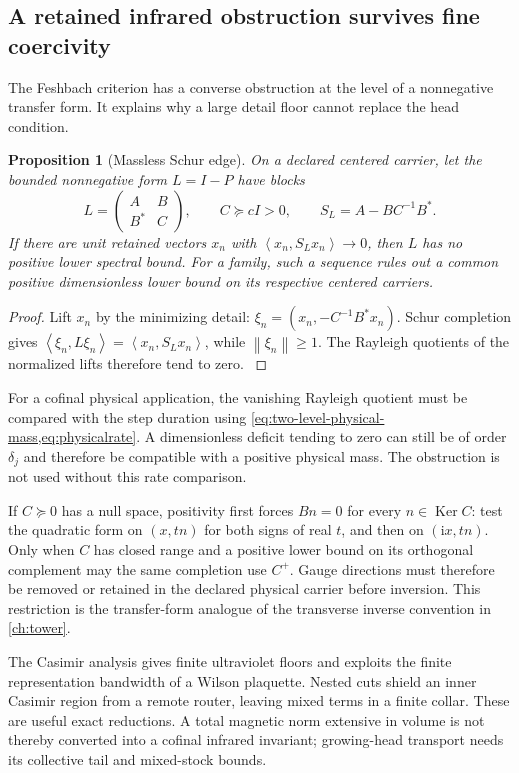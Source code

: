 \documentclass[11pt,oneside,openany]{book}
\newtheorem{proposition}[proposition]{Proposition}
\theoremstyle{definition}
\theoremstyle{remark}
\newcommand{\ii}{\mathrm i}
\newcommand{\Ker}{\operatorname{Ker}}
\newcommand{\norm}[1]{\left\lVert#1\right\rVert}
\newcommand{\ip}[2]{\left\langle#1,#2\right\rangle}
\newcommand{\src}[2]{\cite[#2]{#1}}
\begin{document}
\subsection{A retained infrared obstruction survives fine coercivity}
The Feshbach criterion has a converse obstruction at the level of a
nonnegative transfer form. It explains why a large detail floor cannot
replace the head condition.

\begin{proposition}[Massless Schur edge]
\label{prop:massless-Schur-edge}
On a declared centered carrier, let the bounded nonnegative form
$L=I-P$ have blocks
\[
L=\begin{pmatrix}A&B\\B^*&C\end{pmatrix},\qquad C\succeq cI>0,
\qquad S_L=A-BC^{-1}B^*.
\]
If there are unit retained vectors $x_n$ with
$\ip{x_n}{S_Lx_n}\to0$, then $L$ has no positive lower spectral bound.
For a family, such a sequence rules out a common positive
dimensionless lower bound on its respective centered carriers.
\end{proposition}
\begin{proof}
Lift $x_n$ by the minimizing detail:
$\xi_n=(x_n,-C^{-1}B^*x_n)$. Schur completion gives
$\ip{\xi_n}{L\xi_n}=\ip{x_n}{S_Lx_n}$, while
$\norm{\xi_n}\ge1$. The Rayleigh quotients of the normalized lifts
therefore tend to zero. \src{F6}{V57}
\end{proof}

For a cofinal physical application, the vanishing Rayleigh quotient
must be compared with the step duration using
\cref{eq:two-level-physical-mass,eq:physicalrate}. A dimensionless
deficit tending to zero can still be of order $\delta_j$ and therefore
be compatible with a positive physical mass. The obstruction is not
used without this rate comparison.

If $C\succeq0$ has a null space, positivity first forces
$B n=0$ for every $n\in\Ker C$: test the quadratic form on
$(x,tn)$ for both signs of real $t$, and then on $(\ii x,tn)$.
Only when $C$ has closed range and a positive lower bound on its
orthogonal complement may the same completion use $C^+$.
Gauge directions must therefore be removed or retained in the declared
physical carrier before inversion. This restriction is the transfer-form
analogue of the transverse inverse convention in \cref{ch:tower}.

The Casimir analysis gives finite ultraviolet floors and exploits the finite representation bandwidth of a Wilson plaquette. Nested cuts shield an inner Casimir region from a remote router, leaving mixed terms in a finite collar. These are useful exact reductions. A total magnetic norm extensive in volume is not thereby converted into a cofinal infrared invariant; growing-head transport needs its collective tail and mixed-stock bounds. \src{F1}{V3--V6}
\end{document}
